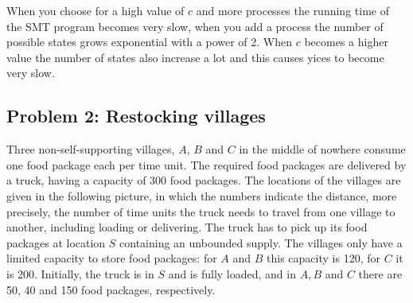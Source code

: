 \documentclass[12pt]{article}
\begin{document}
{\vspace{3mm}


\noindent When you choose for a high value of $c$ and more processes the running time of the SMT program becomes very slow, when you add a process the number of possible states grows exponential with a power of 2. When $c$ becomes a higher value the number of states also increase a lot and this causes yices to become very slow.

\vspace{3mm}

\subsection*{Problem 2: Restocking villages}

Three non-self-supporting villages, $A$, $B$ and $C$ in the middle of nowhere consume one food package each per time unit. The required food packages are delivered by a truck, having a capacity of 300 food packages. The locations of the villages are given in the following picture, in which the numbers indicate the distance, more precisely, the number of time units the truck needs to travel from one village to another, including loading or delivering. The truck has to pick up its food packages at location $S$ containing an unbounded supply. The villages only have a limited capacity to store food packages: for $A$ and $B$ this capacity is 120, for $C$ it is 200. Initially, the truck is in $S$ and is fully loaded, and in $A, B$ and $C$ there are 50, 40 and 150 food packages, respectively.

}
\end{document}
